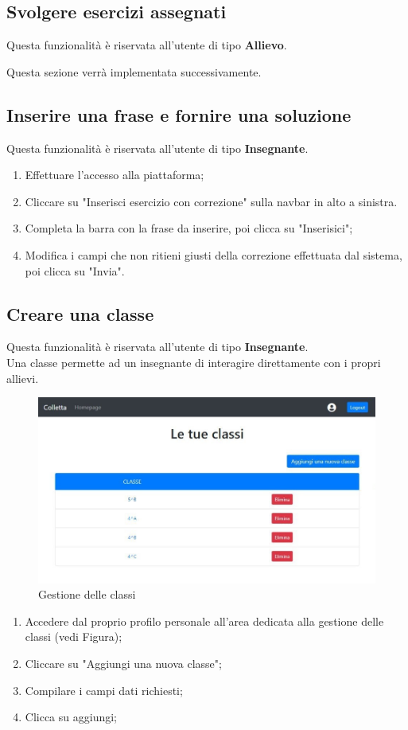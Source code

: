 \documentclass[11pt,a4paper]{article}
\begin{document}
{\begin{enumerate}
	\end{enumerate}
	\subsection{Svolgere esercizi assegnati}
	Questa funzionalità è riservata all'utente di tipo \textbf{Allievo}.
	
	Questa sezione verrà implementata successivamente.
		
	\subsection{Inserire una frase e fornire una soluzione}
			Questa funzionalità è riservata all'utente di tipo \textbf{Insegnante}.
			\begin{enumerate}
				\item Effettuare l'accesso alla piattaforma;
				\item Cliccare su "Inserisci esercizio con correzione" sulla navbar in alto a sinistra.
				\item Completa la barra con la frase da inserire, poi clicca su "Inserisici";
				\item Modifica i campi che non ritieni giusti della correzione effettuata dal sistema, poi clicca su "Invia". 
			\end{enumerate}

			
	\subsection{Creare una classe}
			Questa funzionalità è riservata all'utente di tipo \textbf{Insegnante}.\\
			Una classe permette ad un insegnante di interagire direttamente con i propri allievi.
				\begin{figure}[h!]
				\centering
				\includegraphics[scale=0.65]{images/classi.jpg}
				\caption{Gestione delle classi}
			\end{figure}
					\begin{enumerate}
			\item Accedere dal proprio profilo personale all'area dedicata alla gestione delle classi (vedi Figura);
			\item Cliccare su "Aggiungi una nuova classe";
			\item Compilare i campi dati richiesti;
			\item Clicca su aggiungi;
		\end{enumerate}
}
\end{document}
